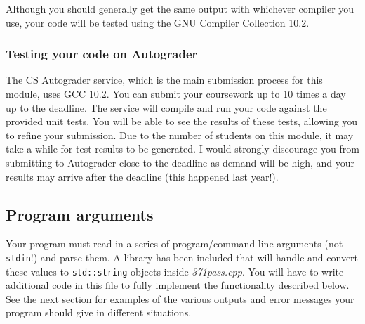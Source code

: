 \documentclass[a4paper]{article}
\begin{document}
Although you should generally get the same output with whichever compiler you use, your code will be tested using the GNU Compiler Collection 10.2.

\subsubsection*{Testing your code on Autograder}
The CS Autograder service, which is the main submission process for this module, uses GCC 10.2. You can submit your coursework up to 10 times a day up to the deadline. The service will compile and run your code against the provided unit tests. You will be able to see the results of these tests, allowing you to refine your submission. Due to the number of students on this module, it may take a while for test results to be generated. I would strongly discourage you from submitting to Autograder close to the deadline as demand will be high, and your results may arrive after the deadline (this happened last year!).



\subsection*{Program arguments}\label{sec:cwk args}
Your program must read in a series of program/command line arguments (not \texttt{stdin}!) and parse them. A library has been included that will handle and convert these values to \texttt{std::string} objects inside \emph{371pass.cpp}. You will have to write additional code in this file to fully implement the functionality described below. See \hyperref[sec:cwk outputs]{the next section} for examples of the various outputs and error messages your program should give in different situations. 
\end{document}
